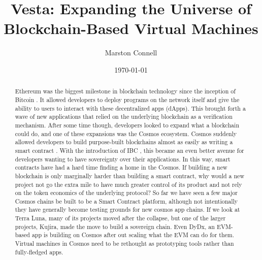 \documentclass[a4paper]{article}
\begin{document}
\title{Vesta: Expanding the Universe of Blockchain-Based Virtual Machines}

\author{Marston Connell}

\date{\today}


\maketitle
\newpage


\begin{abstract}
  Ethereum was the biggest milestone in blockchain technology since the inception of Bitcoin \cite{ethereum}. It allowed developers to deploy programs on the network itself and give the ability to users to interact with these decentralized apps (dApps). This brought forth a wave of new applications that relied on the underlying blockchain as a verification mechanism. After some time though, developers looked to expand what a blockchain could do, and one of these expansions was the Cosmos ecosystem. Cosmos suddenly allowed developers to build purpose-built blockchains almost as easily as writing a smart contract \cite{cosmos}. With the introduction of IBC \cite{ibc}, this became an even better avenue for developers wanting to have sovereignty over their applications. In this way, smart contracts have had a hard time finding a home in the Cosmos. If building a new blockchain is only marginally harder than building a smart contract, why would a new project not go the extra mile to have much greater control of its product and not rely on the token economics of the underlying protocol? So far we have seen a few major Cosmos chains be built to be a Smart Contract platform, although not intentionally they have generally become testing grounds for new cosmos app chains. If we look at Terra Luna, many of its projects moved after the collapse, but one of the larger projects, Kujira, made the move to build a sovereign chain. Even DyDx, an EVM-based app is building on Cosmos after out scaling what the EVM can do for them. Virtual machines in Cosmos need to be rethought as prototyping tools rather than fully-fledged apps.
\end{abstract}

\newpage
\tableofcontents
\newpage
\end{document}
